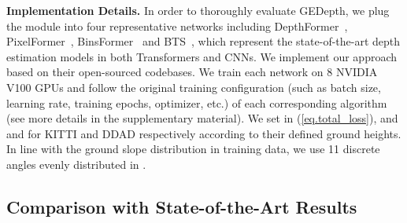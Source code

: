 \documentclass[10pt,twocolumn,letterpaper]{article}
\begin{document}
\noindent\textbf{Implementation Details.} In order to thoroughly evaluate GEDepth, we plug the module into four representative networks including DepthFormer~\cite{li2022depthformer}, PixelFormer~\cite{agarwal2023attention}, BinsFormer~\cite{li2022binsformer} and BTS~\cite{lee2019big}, which represent the state-of-the-art depth estimation models in both Transformers and CNNs. We implement our approach based on their open-sourced codebases. We train each network on 8 NVIDIA V100 GPUs and follow the original training configuration (such as batch size, learning rate, training epochs, optimizer, etc.) of each corresponding algorithm (see more details in the supplementary material). We set  in (\ref{eq.total_loss}), and  and  for KITTI and DDAD respectively according to their defined ground heights. In line with the ground slope distribution in training data, we use 11 discrete angles evenly distributed in .

\subsection{Comparison with State-of-the-Art Results}
\end{document}
